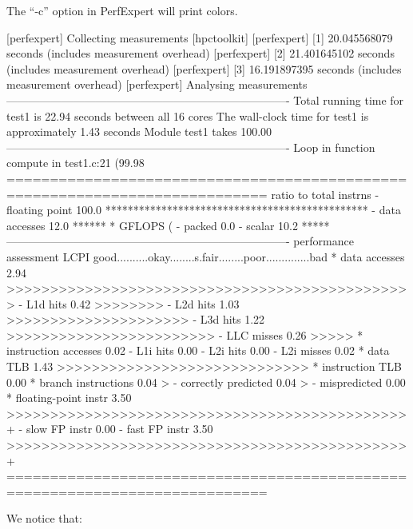 The ``-c'' option in PerfExpert will print colors.

\begin{prompt}
[perfexpert] Collecting measurements [hpctoolkit]
[perfexpert]    [1] 20.045568079 seconds (includes measurement overhead)
[perfexpert]    [2] 21.401645102 seconds (includes measurement overhead)
[perfexpert]    [3] 16.191897395 seconds (includes measurement overhead)
[perfexpert] Analysing measurements
----------------------------------------------------------------------------
Total running time for test1 is 22.94 seconds between all 16 cores
The wall-clock time for test1 is approximately 1.43 seconds
Module test1 takes 100.00%
----------------------------------------------------------------------------
Loop in function compute in test1.c:21 (99.98%
============================================================================
ratio to total instrns    %
 - floating point      100.0 ***********************************************
 - data accesses        12.0 ******
* GFLOPS (%
 - packed                0.0
 - scalar               10.2 *****
----------------------------------------------------------------------------
performance assessment  LCPI good..........okay........s.fair........poor..............bad
* data accesses         2.94 >>>>>>>>>>>>>>>>>>>>>>>>>>>>>>>>>>>>>>>>>>>>>>>
 - L1d hits             0.42 >>>>>>>>
 - L2d hits             1.03 >>>>>>>>>>>>>>>>>>>>>
 - L3d hits             1.22 >>>>>>>>>>>>>>>>>>>>>>>>
 - LLC misses           0.26 >>>>>
* instruction accesses  0.02
 - L1i hits              0.00
 - L2i hits             0.00
 - L2i misses           0.02
* data TLB              1.43 >>>>>>>>>>>>>>>>>>>>>>>>>>>>>
* instruction TLB       0.00
* branch instructions   0.04 >
 - correctly predicted  0.04 >
 - mispredicted         0.00
* floating-point instr  3.50 >>>>>>>>>>>>>>>>>>>>>>>>>>>>>>>>>>>>>>>>>>>>>>+
 - slow FP instr        0.00
 - fast FP instr        3.50 >>>>>>>>>>>>>>>>>>>>>>>>>>>>>>>>>>>>>>>>>>>>>>+
============================================================================
\end{prompt}

We notice that:

